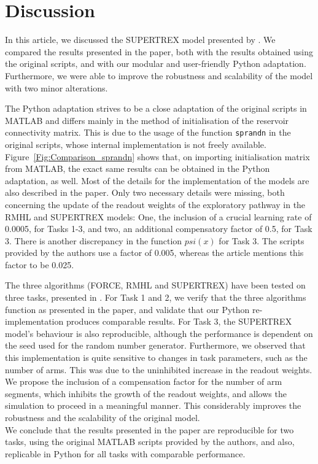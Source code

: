 
\section{Discussion}

In this article, we discussed the SUPERTREX model presented by
\textcite{pyle2019}. We compared the results presented in the paper,
both with the results obtained using the original scripts, and with our modular and user-friendly Python adaptation. Furthermore, we were able to improve the robustness and scalability of the model with two minor alterations.

The Python adaptation strives to be a close adaptation of the original scripts in MATLAB and differs mainly in the method of initialisation of the reservoir connectivity matrix. This is due to the usage of the function {\tt sprandn} in the original scripts, whose internal implementation is not freely available. Figure~\ref{Fig:Comparison_sprandn} shows that, on importing initialisation matrix from MATLAB, the exact same results can be obtained in the Python adaptation, as well. Most of the details for the implementation of the models are also described in the paper. Only two necessary details were missing, both concerning the update of the readout weights of the exploratory pathway in the RMHL and SUPERTREX models: One, the inclusion of a crucial learning rate of 0.0005, for Tasks 1-3, and two, an additional compensatory factor of 0.5, for Task 3. There is another discrepancy in the function $psi(x)$ for Task 3. The scripts provided by the authors use a factor of 0.005, whereas the article mentions this factor to be 0.025.

The three algorithms (FORCE, RMHL and SUPERTREX) have been tested on three tasks, presented in \textcite{pyle2019}. For Task 1 and 2, we verify that the three algorithms function as presented in the paper, and validate that our Python re-implemen\-tation produces comparable results. For Task 3, the SUPERTREX model's behaviour is also reproducible, although the performance is dependent on the seed used for the random number generator. Furthermore, we observed that this implementation is quite sensitive to changes in task parameters, such as the number of arms. This was due to the uninhibited increase in the readout weights. We propose the inclusion of a compensation factor for the number of arm segments, which inhibits the growth of the readout weights, and allows the simulation to proceed in a meaningful manner. This considerably improves the robustness and the scalability of the original model.\\

We conclude that the results presented in the paper are  reproducible for two tasks, using the original MATLAB scripts provided by the authors, and also, replicable in Python for all tasks with comparable performance.

